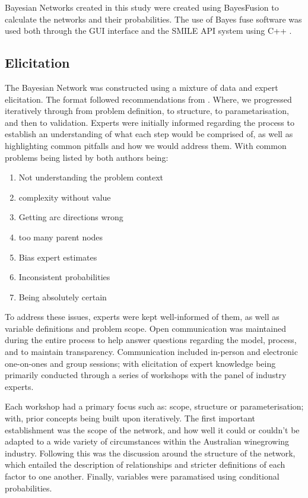 Bayesian Networks created in this study were created using BayesFusion \citep{bayesfusionGeNIeModelerUSER2022} to calculate the networks and their probabilities. The use of Bayes fuse software was used both through the GUI interface and the SMILE API \citep{bayesfusionGeNIeModelerUSER2022} system using C++ \citep{ISO:2012:III}.

\subsection{Elicitation}

The Bayesian Network was constructed using a mixture of data and expert elicitation. The format followed recommendations from \cite{korbBayesianArtificialIntelligence2011,pitchforthProposedValidationFramework2013}. Where, we progressed iteratively through from problem definition, to structure, to parametarisation, and then to validation. Experts were initially informed regarding the process to establish an understanding of what each step would be comprised of, as well as highlighting common pitfalls and how we would address them. With common problems being listed by both authors being:
\begin{enumerate}
        \item Not understanding the problem context
        \item complexity without value
        \item Getting arc directions wrong
        \item too many parent nodes
        \item Bias expert estimates
        \item Inconsistent probabilities
        \item Being absolutely certain
\end{enumerate}
To address these issues, experts were kept well-informed of them, as well as variable definitions and problem scope. Open communication was maintained during the entire process to help answer questions regarding the model, process, and to maintain transparency. Communication included in-person and electronic one-on-ones and group sessions; with elicitation of expert knowledge being primarily conducted through a series of workshops with the panel of industry experts.

Each workshop had a primary focus such as: scope, structure or parameterisation; with, prior concepts being built upon iteratively. The first important establishment was the scope of the network, and how well it could or couldn't be adapted to a wide variety of circumstances within the Australian winegrowing industry. Following this was the discussion around the structure of the network, which entailed the description of relationships and stricter definitions of each factor to one another. Finally, variables were paramatised using conditional probabilities.

